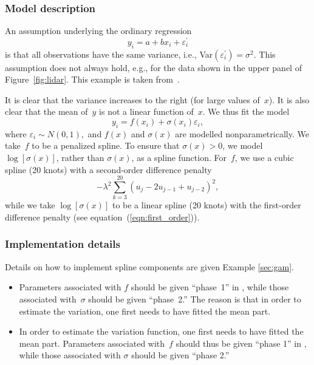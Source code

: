 \documentclass{admbmanual}
\newcommand{\citeasnoun}{\cite}
\begin{document}
\subsubsection{Model description}
An assumption underlying the ordinary regression
\[
y_{i}=a+bx_{i}+\varepsilon _{i}^{\prime }
\]
is that all observations have the same variance, i.e.,
Var$\left( \varepsilon_{i}^{\prime }\right) =\sigma^{2}$. This assumption does
not always hold, e.g., for the data shown in the upper panel of
Figure~\ref{fig:lidar}. This example is taken
from~\citeasnoun{rupp:wand:carr:2003}.

It is clear that the variance increases to the right (for large values of~$x$).
It is also clear that the mean of~$y$ is not a linear function of~$x$. We thus
fit the model
\[
y_{i}=f(x_{i})+\sigma (x_{i})\varepsilon _{i},
\]
where $\varepsilon _{i}\sim N(0,1),$ and $f(x)$ and $\sigma (x)$ are modelled
nonparametrically. We take~$f$ to be a penalized spline. To ensure that $\sigma
(x)>0$, we model $\log \left[ \sigma (x)\right] $, rather than $\sigma (x)$, as
a spline function. For~$f$, we use a cubic spline (20 knots) with a second-order
difference penalty%
\[
-\lambda ^{2}\sum_{k=3}^{20}\left( u_{j}-2u_{j-1}+u_{j-2}\right) ^{2},
\]
while we take $\log \left[ \sigma (x)\right]$ to be a linear spline (20 knots)
with the first-order difference penalty (see equation~(\ref{eqn:first_order})).

\subsubsection{Implementation details}

Details on how to implement spline components are given Example \ref{sec:gam}.

\begin{itemize}
  \item Parameters associated with $f$ should be given ``phase~1'' in \scAB,
  while those associated with~$\sigma $ should be given ``phase~2.'' The reason
  is that in order to estimate the variation, one first needs to have fitted the
  mean part.

  \item In order to estimate the variation function, one first needs to have
  fitted the mean part. Parameters associated with~$f$ should thus be given
  ``phase 1'' in \scAB, while those associated with $\sigma$ should be given
  ``phase 2.''
\end{itemize}
\end{document}
